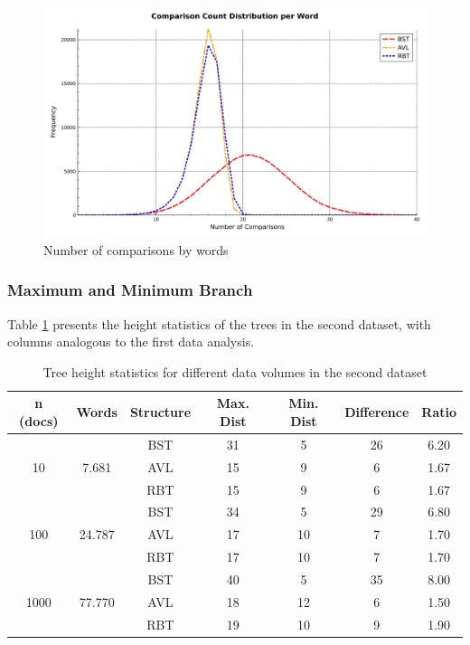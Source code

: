  \begin{figure}[H]
     \centering
     \includegraphics[width=0.8\linewidth]{img/Graph_6_77770.pdf}
     \caption{Number of comparisons by words}
     \label{fig:comparacoes2}
 \end{figure}

 \subsubsection{Maximum and Minimum Branch}

 Table \ref{tab:altura_db2} presents the height statistics of the trees in the second dataset,
 with columns analogous to the first data analysis.

 \begin{table}[H]
     \centering
     \begin{tabular}{|c|c|c|c|c|c|c|}
     \hline
     \textbf{n (docs)} & \textbf{Words} & \textbf{Structure} & \textbf{Max. Dist} & \textbf{Min. Dist} & \textbf{Difference} & \textbf{Ratio} \\
     \hline
     \multirow{3}{*}{10} & \multirow{3}{*}{7.681} & BST & 31 & 5 & 26 & 6.20 \\
     & & AVL & 15 & 9 & 6 & 1.67 \\
     & & RBT & 15 & 9 & 6 & 1.67 \\
     \hline
     \multirow{3}{*}{100} & \multirow{3}{*}{24.787} & BST & 34 & 5 & 29 & 6.80 \\
     & & AVL & 17 & 10 & 7 & 1.70 \\
     & & RBT & 17 & 10 & 7 & 1.70 \\
     \hline
     \multirow{3}{*}{1000} & \multirow{3}{*}{77.770} & BST & 40 & 5 & 35 & 8.00 \\
     & & AVL & 18 & 12 & 6 & 1.50 \\
     & & RBT & 19 & 10 & 9 & 1.90 \\
     \hline
     \end{tabular}
     \caption{Tree height statistics for different data volumes in the second dataset}
     \label{tab:altura_db2}
 \end{table}

